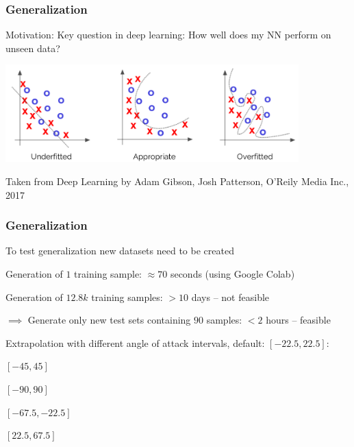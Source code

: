 \begin{frame}
    \frametitle{Generalization}
    \vspace*{0.8cm}
Motivation: Key question in deep learning: How well does my NN perform on unseen data?


\includegraphics[width=0.85\textwidth, height=.5\textheight]{./Ressourcen/Praesentation/Bilder/generalization.png}%

\vspace*{-0.6cm}

Taken from Deep Learning by Adam Gibson, Josh Patterson, O'Reily Media Inc., 2017

\end{frame}
\clearpage

\begin{frame}
    \frametitle{Generalization}
    \vspace*{0.8cm}
To test generalization new datasets need to be created

Generation of $1$ training sample:  $\approx 70$ seconds (using Google Colab)

Generation of $12.8k$ training samples: $> 10$ days -- not feasible 

$\implies$ Generate only new test sets containing $90$ samples: $< 2$ hours -- feasible

Extrapolation with different angle of attack intervals, default: $[-22.5, 22.5]$:

\begin{PraesentationAufzaehlung}
    \item $[-45, 45]$
    \item $[-90, 90]$
    \item $[-67.5, -22.5]$
    \item $[22.5, 67.5]$
\end{PraesentationAufzaehlung}


\end{frame}
\clearpage

